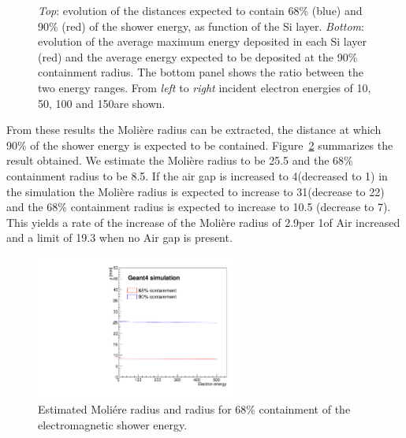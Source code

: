 \begin{figure}[h!]
\begin{center}
    \caption{
{\em Top}: evolution of the distances expected to contain 68\% (blue) and
90\% (red) of the shower energy, as function of the Si layer.
{\em Bottom}: evolution of the average maximum energy deposited in
each Si layer (red) and the average energy expected to be deposited at
the 90\% containment radius. The bottom panel shows the ratio between
the two energy ranges.
From {\em left} to {\em right} incident electron energies of 10, 50,
100 and 150\GeV are shown.
   }
    \label{fig:showertranssummary}
  \end{center}
\end{figure}


From these results the Moli\`{e}re radius can be extracted, \ie the
distance at which 90\% of the shower energy is expected to be
contained. Figure~\ref{fig:showermoliere} summarizes the
result obtained.
We estimate the  Moli\`{e}re radius to be 25.5\mm
and the 68\% containment radius to be 8.5\mm.
If the air gap is increased to 4\mm (decreased to 1\mm) in the
simulation the Moli\`{e}re radius is expected to increase to 31\mm (decrease to
22\mm) and the 68\% containment radius is expected to increase to 10.5\mm
(decrease to 7\mm).
This yields a rate of the increase of the Moli\`{e}re radius
of 2.9\mm per 1\mm of Air increased and a limit of 19.3\mm
when no Air gap is present.


\begin{figure}[h!]
  \begin{center}
    \includegraphics[width=0.6\textwidth]{figures/cmolsensorenhitsvsr}
    \caption{ Estimated Moli\'{e}re radius and radius for 68\%
      containment of the electromagnetic shower energy.}
    \label{fig:showermoliere}
  \end{center}
\end{figure}

